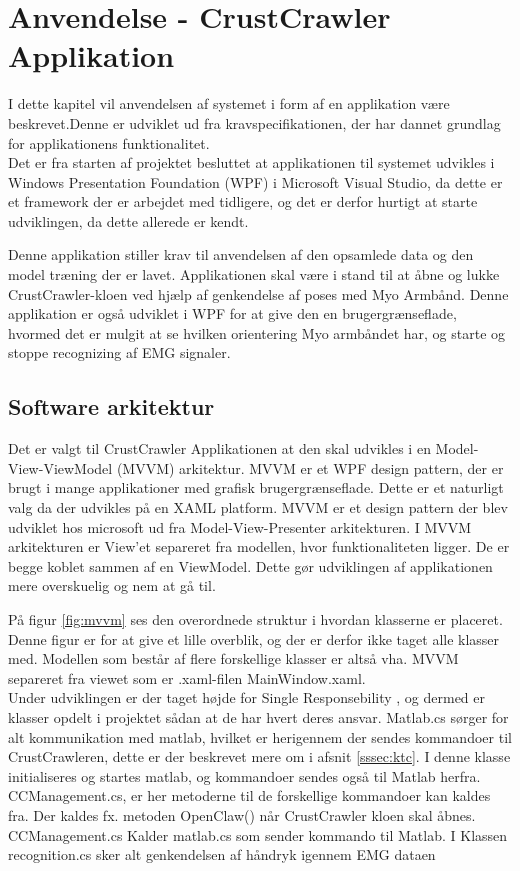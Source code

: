 \thispagestyle{fancy}
\chapter{Anvendelse - CrustCrawler Applikation}
\label{chp:designogimpl}

I dette kapitel vil anvendelsen af systemet i form af en applikation være beskrevet.Denne er udviklet ud fra kravspecifikationen, der har dannet grundlag for applikationens funktionalitet.\\
Det er fra starten af projektet besluttet at applikationen til systemet udvikles i Windows Presentation Foundation (WPF) i Microsoft Visual Studio, da dette er et framework der er arbejdet med tidligere, og det er derfor hurtigt at starte udviklingen, da dette allerede er kendt.

Denne applikation stiller krav til anvendelsen af den opsamlede data og den model træning der er lavet. Applikationen skal være i stand til at åbne og lukke CrustCrawler-kloen ved hjælp af genkendelse af poses med Myo Armbånd. Denne applikation er også udviklet i WPF for at give den en brugergrænseflade, hvormed det er mulgit at se hvilken orientering Myo armbåndet har, og starte og stoppe recognizing af EMG signaler.

\section{Software arkitektur}
Det er valgt til CrustCrawler Applikationen at den skal udvikles i en Model-View-ViewModel (MVVM) arkitektur. MVVM er et WPF design pattern, der er brugt i mange applikationer med grafisk brugergrænseflade. Dette er et naturligt valg da der udvikles på en XAML platform. MVVM er et design pattern der blev udviklet hos microsoft ud fra Model-View-Presenter arkitekturen. I MVVM arkitekturen er View'et separeret fra modellen, hvor funktionaliteten ligger. De er begge koblet sammen af en ViewModel. Dette gør udviklingen af applikationen mere overskuelig og nem at gå til.


På figur \ref{fig:mvvm} ses den overordnede struktur i hvordan klasserne er placeret. Denne figur er for at give et lille overblik, og der er derfor ikke taget alle klasser med. Modellen som består af flere forskellige klasser er altså vha. MVVM separeret fra viewet som er .xaml-filen MainWindow.xaml.\\
Under udviklingen er der taget højde for Single Responsebility \cite{SingleRespons}, og dermed er klasser opdelt i projektet sådan at de har hvert deres ansvar. Matlab.cs sørger for alt kommunikation med matlab, hvilket er herigennem der sendes kommandoer til CrustCrawleren, dette er der beskrevet mere om i afsnit \ref{sssec:ktc}. I denne klasse initialiseres og startes matlab, og kommandoer sendes også til Matlab herfra. CCManagement.cs, er her metoderne til de forskellige kommandoer kan kaldes fra. Der kaldes fx. metoden OpenClaw() når CrustCrawler kloen skal åbnes. CCManagement.cs Kalder matlab.cs som sender kommando til Matlab. I Klassen recognition.cs sker alt genkendelsen af håndryk igennem EMG dataen

